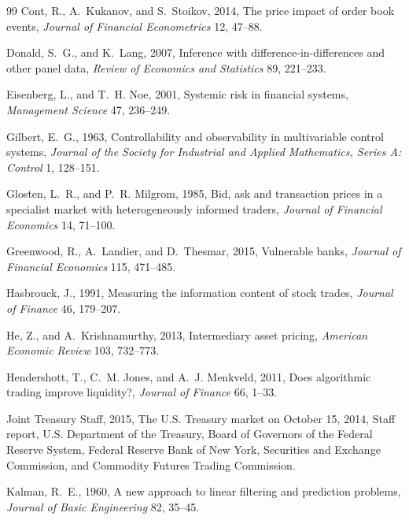 \documentclass[12pt]{article}
\theoremstyle{definition}
\theoremstyle{remark}
\begin{document}
\begin{thebibliography}{99}
Cont, R., A.~Kukanov, and S.~Stoikov, 2014, The price impact of order book events, \emph{Journal of Financial Econometrics} 12, 47--88.

Donald, S.~G., and K.~Lang, 2007, Inference with difference-in-differences and other panel data, \emph{Review of Economics and Statistics} 89, 221--233.

Eisenberg, L., and T.~H. Noe, 2001, Systemic risk in financial systems, \emph{Management Science} 47, 236--249.

Gilbert, E.~G., 1963, Controllability and observability in multivariable control systems, \emph{Journal of the Society for Industrial and Applied Mathematics, Series A: Control} 1, 128--151.

Glosten, L.~R., and P.~R. Milgrom, 1985, Bid, ask and transaction prices in a specialist market with heterogeneously informed traders, \emph{Journal of Financial Economics} 14, 71--100.

Greenwood, R., A.~Landier, and D.~Thesmar, 2015, Vulnerable banks, \emph{Journal of Financial Economics} 115, 471--485.

Hasbrouck, J., 1991, Measuring the information content of stock trades, \emph{Journal of Finance} 46, 179--207.

He, Z., and A.~Krishnamurthy, 2013, Intermediary asset pricing, \emph{American Economic Review} 103, 732--773.

Hendershott, T., C.~M. Jones, and A.~J. Menkveld, 2011, Does algorithmic trading improve liquidity?, \emph{Journal of Finance} 66, 1--33.

Joint Treasury Staff, 2015, The U.S. Treasury market on October 15, 2014, Staff report, U.S. Department of the Treasury, Board of Governors of the Federal Reserve System, Federal Reserve Bank of New York, Securities and Exchange Commission, and Commodity Futures Trading Commission.

Kalman, R.~E., 1960, A new approach to linear filtering and prediction problems, \emph{Journal of Basic Engineering} 82, 35--45.


\end{thebibliography}
\end{document}
